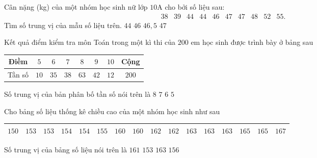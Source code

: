 \begin{ex}%
	Cân nặng (kg) của một nhóm học sinh nữ lớp $10$A cho bởi số liệu  sau:
	$$ 
	\begin{array}{llllllllll}
		38 & 39 & 44 & 44 & 46 & 47 & 47 & 48 & 52 & 55. 
	\end{array}
	$$ 
	Tìm  số trung vị của mẫu số liệu trên.
	\choice 
		{$44$} 
		{$46$} 
		{\True  $46{,}5$}
		 {$47$}
\end{ex}

\begin{ex}%
	Kết quả điểm kiểm tra môn Toán trong một kì thi của $200$ em học sinh  được trình bày ở bảng sau
	\begin{center}
		\begin{tabular}{|c|c|c|c|c|c|c|c|}
			\hline Điềm & $5$ & $6$ & $7$ & $8$ & $9$ & $10$  & Cộng\\
			 \hline Tần số & $10$ & $35$ & $38$ & $63$ & $42$ & $12$ & $200$\\
			\hline 
		\end{tabular}
	\end{center}
	Số trung vị của bản phân bố tần số nói trên  là
	 \choice
		 {\True $8$}
		 {$7$}
		 {$6$}
		 {$5$}
\end{ex}

\begin{ex}%
	Cho bảng số liệu thống kê chiều cao của một nhóm  học sinh như sau
	\begin{center}
		\begin{tabular}{|l|l|l|l|l|l|l|l|l|l|l|l|l|l|l|l|}
			\hline $150$ & $153$ & $153$ & $154$ & $154$ & $155$ & $160$ & $160$ & $162$ & $162$ & $163$ & $163$ & $163$ &  $165$ & $165$ & $167$\\
			\hline 
		\end{tabular}
	\end{center}
	Số trung vị của bảng  số liệu nói trên là
	 \choice
		{\True  $161$}
		{$153$} 
		 {$163$}
		{$156$} 
\end{ex}

